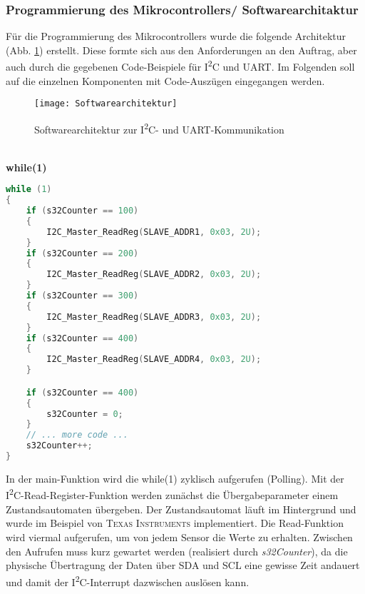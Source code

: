 \documentclass[
	letterpaper, %
	10pt, %
]{CSUniSchoolLabReport}
\begin{document}
\begin{spacing}{1.6}
\newpage
\subsubsection{Programmierung des Mikrocontrollers/ Softwarearchitaktur}
Für die Programmierung des Mikrocontrollers wurde die folgende Architektur (Abb. \ref{fig:Softwarearchitektur}) erstellt. Diese formte sich aus den Anforderungen an den Auftrag, aber auch durch die gegebenen Code-Beispiele für I\textsuperscript{2}C und UART. Im Folgenden soll auf die einzelnen Komponenten mit Code-Auszügen eingegangen werden.
\begin{figure}[H]
    \centering
    \texttt{[image: Softwarearchitektur]}
    \caption{Softwarearchitektur zur I\textsuperscript{2}C- und UART-Kommunikation}
    \label{fig:Softwarearchitektur}
\end{figure}


\textbf{\\while(1)}
\renewcommand{\lstlistingname}{listing}
\begin{lstlisting}[caption={Auszug aus while(1) - Projekt \glqq Kraftsensor\grqq},label={lst:while1},language=C]
while (1)
{
    if (s32Counter == 100)
    {
        I2C_Master_ReadReg(SLAVE_ADDR1, 0x03, 2U);
    }
    if (s32Counter == 200)
    {
        I2C_Master_ReadReg(SLAVE_ADDR2, 0x03, 2U);
    }
    if (s32Counter == 300)
    {
        I2C_Master_ReadReg(SLAVE_ADDR3, 0x03, 2U);
    }
    if (s32Counter == 400)
    {
        I2C_Master_ReadReg(SLAVE_ADDR4, 0x03, 2U);
    }

    if (s32Counter == 400)
    {
        s32Counter = 0;
    }
    // ... more code ...
    s32Counter++;
}
\end{lstlisting}
In der main-Funktion wird die while(1) zyklisch aufgerufen (Polling). Mit der I\textsuperscript{2}C-Read-Register-Funktion werden zunächst die Übergabeparameter einem Zustandsautomaten übergeben. Der Zustandsautomat läuft im Hintergrund und wurde im Beispiel von \textsc{Texas Instruments} implementiert. Die Read-Funktion wird viermal aufgerufen, um von jedem Sensor die Werte zu erhalten. Zwischen den Aufrufen muss kurz gewartet werden (realisiert durch \textit{s32Counter}), da die physische Übertragung der Daten über SDA und SCL eine gewisse Zeit andauert und damit der I\textsuperscript{2}C-Interrupt dazwischen auslösen kann.\\


\end{spacing}
\end{document}
